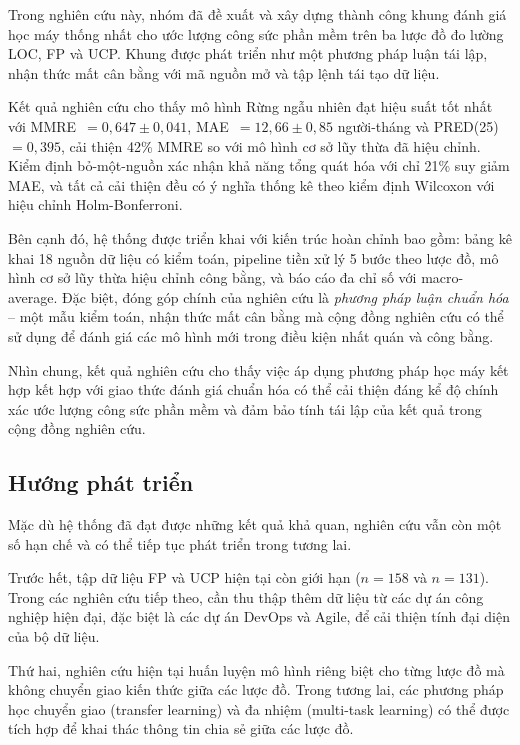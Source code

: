 \documentclass[12pt,a4paper]{article}
\begin{document}
Trong nghiên cứu này, nhóm đã đề xuất và xây dựng thành công khung đánh giá học máy thống nhất cho ước lượng công sức phần mềm trên ba lược đồ đo lường LOC, FP và UCP. Khung được phát triển như một phương pháp luận tái lập, nhận thức mất cân bằng với mã nguồn mở và tập lệnh tái tạo dữ liệu.

Kết quả nghiên cứu cho thấy mô hình Rừng ngẫu nhiên đạt hiệu suất tốt nhất với MMRE~$= 0{,}647 \pm 0{,}041$, MAE~$= 12{,}66 \pm 0{,}85$ người-tháng và PRED(25)~$= 0{,}395$, cải thiện 42\% MMRE so với mô hình cơ sở lũy thừa đã hiệu chỉnh. Kiểm định bỏ-một-nguồn xác nhận khả năng tổng quát hóa với chỉ 21\% suy giảm MAE, và tất cả cải thiện đều có ý nghĩa thống kê theo kiểm định Wilcoxon với hiệu chỉnh Holm-Bonferroni.

Bên cạnh đó, hệ thống được triển khai với kiến trúc hoàn chỉnh bao gồm: bảng kê khai 18 nguồn dữ liệu có kiểm toán, pipeline tiền xử lý 5 bước theo lược đồ, mô hình cơ sở lũy thừa hiệu chỉnh công bằng, và báo cáo đa chỉ số với macro-average. Đặc biệt, đóng góp chính của nghiên cứu là \textit{phương pháp luận chuẩn hóa} -- một mẫu kiểm toán, nhận thức mất cân bằng mà cộng đồng nghiên cứu có thể sử dụng để đánh giá các mô hình mới trong điều kiện nhất quán và công bằng.

Nhìn chung, kết quả nghiên cứu cho thấy việc áp dụng phương pháp học máy kết hợp kết hợp với giao thức đánh giá chuẩn hóa có thể cải thiện đáng kể độ chính xác ước lượng công sức phần mềm và đảm bảo tính tái lập của kết quả trong cộng đồng nghiên cứu.

\subsection{Hướng phát triển}

Mặc dù hệ thống đã đạt được những kết quả khả quan, nghiên cứu vẫn còn một số hạn chế và có thể tiếp tục phát triển trong tương lai.

Trước hết, tập dữ liệu FP và UCP hiện tại còn giới hạn ($n=158$ và $n=131$). Trong các nghiên cứu tiếp theo, cần thu thập thêm dữ liệu từ các dự án công nghiệp hiện đại, đặc biệt là các dự án DevOps và Agile, để cải thiện tính đại diện của bộ dữ liệu.

Thứ hai, nghiên cứu hiện tại huấn luyện mô hình riêng biệt cho từng lược đồ mà không chuyển giao kiến thức giữa các lược đồ. Trong tương lai, các phương pháp học chuyển giao (transfer learning) và đa nhiệm (multi-task learning) có thể được tích hợp để khai thác thông tin chia sẻ giữa các lược đồ.
\end{document}
